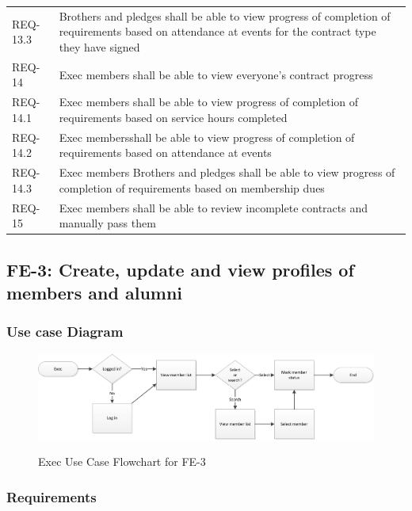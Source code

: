 \documentclass{article}
\newcommand{\req}[1]{REQ-{#1}}
\begin{document}
\begin{tabular}{lp{8cm}}
\req{13.3} & Brothers and pledges shall be able to view progress of completion
of requirements based
on attendance at events for the contract type they have signed\\
\req{14} & Exec members shall be able to view everyone's contract
progress \\
\req{14.1} & Exec members shall be able to view progress of completion
of requirements based
on service hours completed\\
\req{14.2} & Exec membersshall be able to view progress of completion
of requirements based
on attendance at events\\
\req{14.3} & Exec members  Brothers and pledges shall be able to view progress of completion
of requirements based
on membership dues\\
\req{15} & Exec members shall be able to review incomplete contracts
and manually pass them 
\\
\end{tabular}

\subsection{FE-3: Create, update and view profiles of members and
  alumni}

\subsubsection{Use case Diagram}

\newpage

\FloatBarrier
\begin{figure}
\centering
\caption{Exec Use Case Flowchart for FE-3}
\includegraphics[scale=.75]{img/execUseCaseFE3.png}
\label{fig:execUseCaseFE3}
\end{figure}
\FloatBarrier

\newpage

\subsubsection{Requirements}
\end{document}
